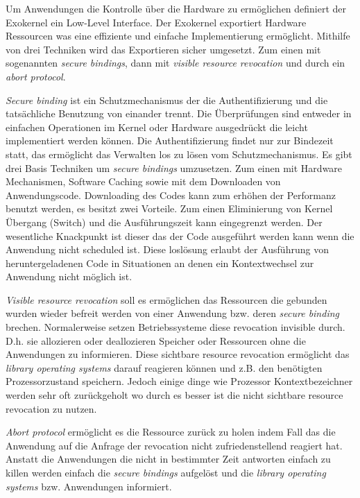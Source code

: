 \documentclass[9pt,technote]{IEEEtran}
\begin{document}
        Um Anwendungen die Kontrolle \"uber die Hardware zu erm\"oglichen definiert der Exokernel ein Low-Level Interface.
        Der Exokernel exportiert Hardware Ressourcen was eine effiziente und einfache Implementierung erm\"oglicht.
        Mithilfe von drei Techniken wird das Exportieren sicher umgesetzt. Zum einen mit sogenannten \textit{secure bindings}, 
        dann mit \textit{visible resource revocation} und durch ein \textit{abort protocol}. 
        
        \textit{Secure binding} ist ein Schutzmechanismus der die Authentifizierung und die tats\"achliche Benutzung von einander trennt.
        Die \"Uberpr\"ufungen sind entweder in einfachen Operationen im Kernel oder Hardware ausgedr\"uckt die leicht implementiert werden k\"onnen.
        Die Authentifizierung findet nur zur Bindezeit statt, das erm\"oglicht das Verwalten los zu l\"osen vom Schutzmechanismus. Es gibt drei Basis Techniken
        um \textit{secure bindings} umzusetzen. Zum einen mit Hardware Mechanismen, Software Caching sowie mit dem Downloaden von Anwendungscode.
        Downloading des Codes kann zum erh\"ohen der Performanz benutzt werden, es besitzt zwei Vorteile. Zum einen Eliminierung von Kernel \"Ubergang (Switch)
        und die Ausf\"uhrungszeit kann eingegrenzt werden. Der wesentliche Knackpunkt ist dieser das der Code ausgef\"uhrt werden kann wenn die Anwendung nicht
        scheduled ist. 
        Diese losl\"osung erlaubt der Ausf\"uhrung von heruntergeladenen Code in Situationen an denen ein Kontextwechsel zur Anwendung nicht m\"oglich ist.
        
        \textit{Visible resource revocation} soll es erm\"oglichen das Ressourcen die gebunden wurden wieder befreit werden von einer Anwendung 
        bzw. deren \textit{secure binding} brechen.
        Normalerweise setzen Betriebssysteme diese revocation invisible durch. 
        D.h. sie allozieren oder deallozieren Speicher oder Ressourcen ohne die Anwendungen zu informieren.
        Diese sichtbare resource revocation erm\"oglicht das \textit{library operating systems} darauf reagieren k\"onnen und
        z.B. den ben\"otigten Prozessorzustand speichern.
        Jedoch einige dinge wie Prozessor Kontextbezeichner werden sehr oft zur\"uckgeholt wo durch es besser ist die nicht sichtbare 
        resource revocation zu nutzen.
        
        \textit{Abort protocol} erm\"oglicht es die Ressource zur\"uck zu holen indem Fall das die Anwendung auf die
        Anfrage der revocation nicht zufriedenstellend reagiert hat.
        Anstatt die Anwendungen die nicht in bestimmter Zeit antworten einfach zu killen werden einfach die
        \textit{secure bindings} aufgel\"ost und die \textit{library operating systems} bzw.
        Anwendungen informiert.
        
\end{document}
